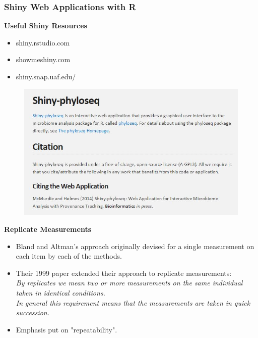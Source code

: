 \documentclass[compress]{beamer}        %
\makeatletter
\newcommand{\tcb}{\textcolor{beamer@blendedblue}}
\makeatother
\begin{document}
		\begin{frame}
			\frametitle{Shiny Web Applications with R}
			\Large
			\textbf{Useful Shiny Resources}
			\bigskip
			\begin{itemize}
				\item  shiny.rstudio.com \bigskip
				\item  showmeshiny.com \bigskip
				\item  shiny.snap.uaf.edu/ \bigskip
			\end{itemize}
		\end{frame}
	
\begin{frame}
			\begin{figure}
				\centering
				\includegraphics[width=0.99\linewidth]{images/SHINYCITE}
			\end{figure}
			
		\end{frame}
		
		\begin{frame}{\bf \tcb{Replicate Measurements}}
			\large
			\begin{itemize}\itemsep0.7cm
				\item Bland and Altman's approach originally devised for a single measurement on each item by each of the methods.
				\item Their 1999 paper \cite{BA99} extended their approach to replicate measurements:\\ \emph{By replicates we mean two or more measurements on the same
					individual taken in identical conditions. \\In general this requirement means that the
					measurements are taken in quick succession. }
				\item Emphasis put on "repeatability".
			\end{itemize}
		\end{frame}
		
\end{document}
